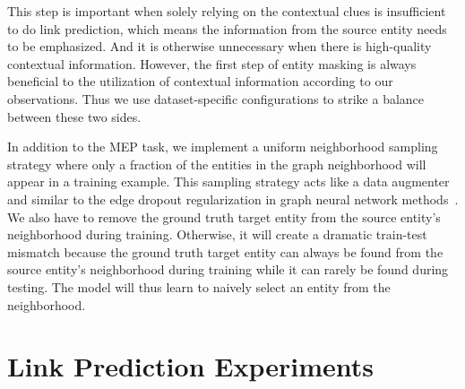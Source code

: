 \documentclass[11pt]{article}
\begin{document}
This step is important when solely relying on the contextual clues is insufficient to do link prediction, which means the information from the source entity needs to be emphasized.
And it is otherwise unnecessary when there is high-quality contextual information.
However, the first step of entity masking is always beneficial to the utilization of contextual information according to our observations.
Thus we use dataset-specific configurations to strike a balance between these two sides.

In addition to the MEP task, we implement a uniform neighborhood sampling strategy where only a fraction of the entities in the graph neighborhood will appear in a training example.
This sampling strategy acts like a data augmenter and similar to the edge dropout regularization in graph neural network methods~\cite{Rong2020DropEdge}.
We also have to remove the ground truth target entity from the source entity's neighborhood during training. Otherwise, it will create a dramatic train-test mismatch because the ground truth target entity can always be found from the source entity's neighborhood during training while it can rarely be found during testing. The model will thus learn to naively select an entity from the neighborhood.  
\section{Link Prediction Experiments}
\label{sec:experiments}
\end{document}
